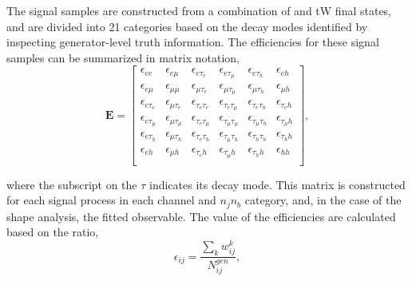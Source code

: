 The signal samples are constructed from a combination of \ttbar and
tW final states, and are divided into 21 categories based on the decay
modes identified by inspecting generator-level truth information.  The
efficiencies for these signal samples can be summarized in matrix
notation,
% 
\begin{equation}
\label{eq:eff_matrix}
\mathbf{E} = \begin{bmatrix}
                \epsilon_{ee}          & \epsilon_{e\mu}          & \epsilon_{e\tau_{e}}          & \epsilon_{e\tau_{\mu}}          & \epsilon_{e\tau_{h}}          & \epsilon_{eh}         \\
                \epsilon_{e\mu}        & \epsilon_{\mu\mu}        & \epsilon_{\mu\tau_{e}}        & \epsilon_{\mu\tau_{\mu}}        & \epsilon_{\mu\tau_{h}}        & \epsilon_{\mu h}      \\
                \epsilon_{e\tau_{e}}   & \epsilon_{\mu\tau_{e}}   & \epsilon_{\tau_{e}\tau_{e}}   & \epsilon_{\tau_{e}\tau_{\mu}}   & \epsilon_{\tau_{e}\tau_{h}}   & \epsilon_{\tau_{e}h}  \\
                \epsilon_{e\tau_{\mu}} & \epsilon_{\mu\tau_{\mu}} & \epsilon_{\tau_{e}\tau_{\mu}} & \epsilon_{\tau_{\mu}\tau_{\mu}} & \epsilon_{\tau_{\mu}\tau_{h}} & \epsilon_{\tau_{\mu}h}\\
                \epsilon_{e\tau_{h}}   & \epsilon_{\mu\tau_{h}}   & \epsilon_{\tau_{e}\tau_{h}}   & \epsilon_{\tau_{\mu}\tau_{h}}   & \epsilon_{\tau_{h}\tau_{h}}   & \epsilon_{\tau_{h}h}  \\
                \epsilon_{eh}          & \epsilon_{\mu h}         & \epsilon_{\tau_{e}h}          & \epsilon_{\tau_{\mu}h}          & \epsilon_{\tau_{h}h}          & \epsilon_{hh}         \\
             \end{bmatrix},
\end{equation}


\noindent where the subscript on the $\tau$ indicates its decay mode.  This
matrix is constructed for each signal process in each channel and $n_j n_b$ category, and, in the case of
the shape analysis, the fitted \pt observable.  The value of
the efficiencies are calculated based on the ratio,
\begin{equation}
\label{eq:model_eff}
    \epsilon_{ij} = \frac{\sum_{k}w_{ij}^k}{N^{gen}_{ij}},
\end{equation}

